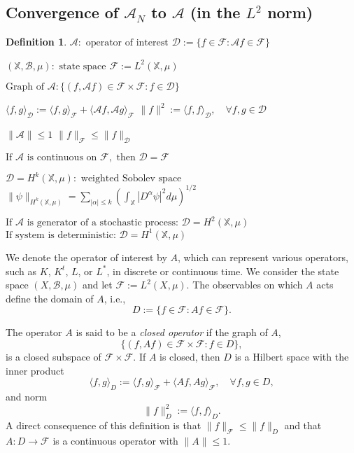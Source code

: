 \documentclass{article}[11]
\newtheorem{definition}[theorem]{Definition}
\begin{document}
\subsection{Convergence of \(\mathcal{A}_N\) to \(\mathcal{A}\) (in the \(L^2\) norm)}

\begin{definition}
	$\mathcal{A}: \text{ operator of interest}$
	$\mathcal{D} := \{f \in \mathcal{F} : \mathcal{A}f \in \mathcal{F}\}$
	
	$(\mathbb{X}, \mathcal{B}, \mu): \text{ state space}$
	$\mathcal{F} := L^2(\mathbb{X}, \mu)$
	
	$\text{Graph of } \mathcal{A}: \{(f, \mathcal{A}f) \in \mathcal{F} \times \mathcal{F} : f \in \mathcal{D}\}$
	
	$\langle f, g \rangle_\mathcal{D} := \langle f, g \rangle_\mathcal{F} + \langle \mathcal{A}f, \mathcal{A}g \rangle_\mathcal{F}$
	$\|f\|^2 := \langle f, f \rangle_\mathcal{D}, \quad \forall f, g \in \mathcal{D}$
	
	$\|\mathcal{A}\| \leq 1$
	$\|f\|_\mathcal{F} \leq \|f\|_\mathcal{D}$
	
	$\text{If } \mathcal{A} \text{ is continuous on } \mathcal{F}, \text{ then } \mathcal{D} = \mathcal{F}$
	
	$\mathcal{D} = H^k(\mathbb{X}, \mu): \text{ weighted Sobolev space}$
	$\|\psi\|_{H^k(\mathbb{X},\mu)} = \sum_{|\alpha|\leq k} \left(\int_\mathbb{X} |D^\alpha \psi|^2 d\mu\right)^{1/2}$
	
	$\text{If } \mathcal{A} \text{ is generator of a stochastic process: } \mathcal{D} = H^2(\mathbb{X}, \mu)$
	$\text{If system is deterministic: } \mathcal{D} = H^1(\mathbb{X}, \mu)$
\end{definition}

We denote the operator of interest by \( A \), which can represent various operators, such as \( K \), \( K^t \), \( L \), or \( L^* \), in discrete or continuous time. We consider the state space \( (X, \mathcal{B}, \mu) \) and let \( \mathcal{F} := L^2(X, \mu) \). The observables on which \( A \) acts define the domain of \( A \), i.e.,
\[
D := \{ f \in \mathcal{F} : A f \in \mathcal{F} \}.
\]

The operator \( A \) is said to be a \textit{closed operator} if the graph of \( A \),
\[
\{ (f, A f) \in \mathcal{F} \times \mathcal{F} : f \in D \},
\]
is a closed subspace of \( \mathcal{F} \times \mathcal{F} \). If \( A \) is closed, then \( D \) is a Hilbert space with the inner product
\[
\langle f, g \rangle_D := \langle f, g \rangle_{\mathcal{F}} + \langle A f, A g \rangle_{\mathcal{F}}, \quad \forall f, g \in D,
\]
and norm
\[
\| f \|_D^2 := \langle f, f \rangle_D.
\]
A direct consequence of this definition is that \( \| f \|_{\mathcal{F}} \leq \| f \|_D \) and that \( A : D \to \mathcal{F} \) is a continuous operator with \( \| A \| \leq 1 \).
\end{document}
